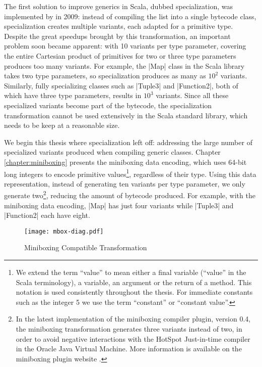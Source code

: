 The first solution to improve generics in Scala, dubbed specialization, was implemented by  \cite{iuli-thesis, specialization-iuli} in 2009: instead of compiling the list into a single bytecode class, specialization creates multiple variants, each adapted for a primitive type. Despite the great speedups brought by this transformation, an important problem soon became apparent: with 10 variants per type parameter, covering the entire Cartesian product of primitives for two or three type parameters produces too many variants. For example, the |Map| class in the Scala library takes two type parameters, so specialization produces as many as $10^2$ variants. Similarly, fully specializing classes such as |Tuple3| and |Function2|, both of which have three type parameters, results in $10^3$ variants. Since all these specialized variants become part of the bytecode, the specialization transformation cannot be used extensively in the Scala standard library, which needs to be keep at a reasonable size.

We begin this thesis where specialization left off: addressing the large number of specialized variants produced when compiling generic classes. Chapter \ref{chapter:miniboxing} presents the miniboxing data encoding, which uses 64-bit long integers to encode primitive values\footnote{We extend the term ``value'' to mean either a final variable (``value'' in the Scala terminology), a variable, an argument or the return of a method. This notation is used consistently throughout the thesis. For immediate constants such as the integer 5 we use the term ``constant'' or ``constant value''.}, regardless of their type. Using this data representation, instead of generating ten variants per type parameter, we only generate two\footnote{In the latest implementation of the miniboxing compiler plugin, version 0.4, the miniboxing transformation generates three variants instead of two, in order to avoid negative interactions with the HotSpot Just-in-time compiler in the Oracle Java Virtual Machine. More information is available on the miniboxing plugin website \cite{miniboxing-www}.}, reducing the amount of bytecode produced. For example, with the miniboxing data encoding, |Map| has just four variants while |Tuple3| and |Function2| each have eight. %

\begin{figure}[h!]
  \centering
  \texttt{[image: mbox-diag.pdf]}
  \caption{Miniboxing Compatible Transformation}
  \label{fig:mbox-diag}
\end{figure}

